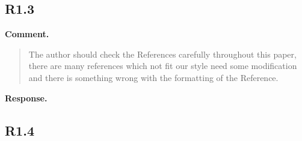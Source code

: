 \documentclass[12pt,a4paper]{article}
\begin{document}
\subsection*{R1.3}

\textbf{Comment.}
\begin{quote}
\raggedright
The author should check the References carefully throughout this paper, there are many references which not fit our style need some modification and there is something wrong with the formatting of the Reference.
\end{quote}

\textbf{Response.}
%
%

\subsection*{R1.4}
\end{document}

